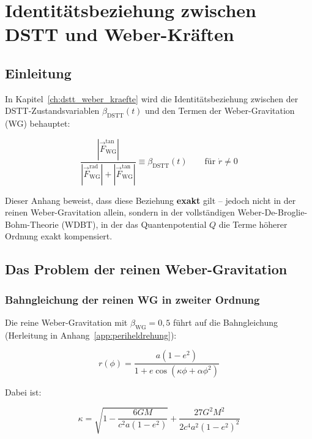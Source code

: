 
\chapter{Identitätsbeziehung zwischen DSTT und Weber-Kräften}
\label{app:identitaetsbeziehung}

\section{Einleitung}
\label{app:identitaet_einleitung}

In Kapitel~\ref{ch:dstt_weber_kraefte} wird die Identitätsbeziehung zwischen der DSTT-Zustandsvariablen \(\beta_{\text{DSTT}}(t)\) und den Termen der Weber-Gravitation (WG) behauptet:

\[
\frac{|\vec{F}_{\text{WG}}^{\text{tan}}|}{|\vec{F}_{\text{WG}}^{\text{rad}}| + |\vec{F}_{\text{WG}}^{\text{tan}}|} \equiv \beta_{\text{DSTT}}(t) \qquad \text{für } \dot{r} \neq 0
\tag{G.1}
\]

Dieser Anhang beweist, dass diese Beziehung \textbf{exakt} gilt – jedoch nicht in der reinen Weber-Gravitation allein, sondern in der vollständigen Weber-De-Broglie-Bohm-Theorie (WDBT), in der das Quantenpotential \(Q\) die Terme höherer Ordnung exakt kompensiert.

\section{Das Problem der reinen Weber-Gravitation}
\label{app:identitaet_problem_wg}

\subsection{Bahngleichung der reinen WG in zweiter Ordnung}
\label{sub:identitaet_bahngleichung}

Die reine Weber-Gravitation mit \(\beta_{\text{WG}} = 0,5\) führt auf die Bahngleichung (Herleitung in Anhang~\ref{app:periheldrehung}):

\[
r(\phi) = \frac{a(1 - e^2)}{1 + e \cos(\kappa\phi + \alpha\phi^2)}
\tag{G.2}
\]

Dabei ist:

\[
\kappa = \sqrt{1 - \frac{6GM}{c^2 a(1-e^2)}} + \frac{27G^2M^2}{2c^4 a^2(1-e^2)^2}
\tag{G.3}
\]

